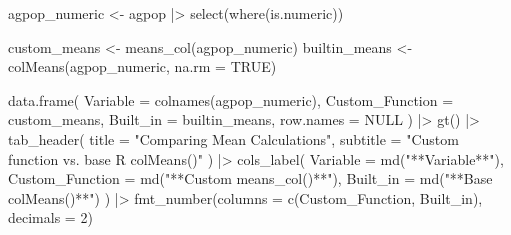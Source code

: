 \documentclass[
  letterpaper,
  DIV=11,
  numbers=noendperiod]{scrreprt}
\newenvironment{Shaded}{\begin{snugshade}}{\end{snugshade}}
\newcommand{\AttributeTok}[1]{\textcolor[rgb]{0.40,0.45,0.13}{#1}}
\newcommand{\ConstantTok}[1]{\textcolor[rgb]{0.56,0.35,0.01}{#1}}
\newcommand{\DecValTok}[1]{\textcolor[rgb]{0.68,0.00,0.00}{#1}}
\newcommand{\FunctionTok}[1]{\textcolor[rgb]{0.28,0.35,0.67}{#1}}
\newcommand{\NormalTok}[1]{\textcolor[rgb]{0.00,0.23,0.31}{#1}}
\newcommand{\OtherTok}[1]{\textcolor[rgb]{0.00,0.23,0.31}{#1}}
\newcommand{\SpecialCharTok}[1]{\textcolor[rgb]{0.37,0.37,0.37}{#1}}
\newcommand{\StringTok}[1]{\textcolor[rgb]{0.13,0.47,0.30}{#1}}
\renewcommand{\[}{\begin{equation}}
\renewcommand{\]}{\end{equation}}
\begin{document}
\begin{Shaded}
\begin{Highlighting}[]
\NormalTok{agpop\_numeric }\OtherTok{\textless{}{-}}\NormalTok{ agpop }\SpecialCharTok{|\textgreater{}} \FunctionTok{select}\NormalTok{(}\FunctionTok{where}\NormalTok{(is.numeric))}

\NormalTok{custom\_means  }\OtherTok{\textless{}{-}} \FunctionTok{means\_col}\NormalTok{(agpop\_numeric)}
\NormalTok{builtin\_means }\OtherTok{\textless{}{-}} \FunctionTok{colMeans}\NormalTok{(agpop\_numeric, }\AttributeTok{na.rm =} \ConstantTok{TRUE}\NormalTok{)}

\FunctionTok{data.frame}\NormalTok{(}
  \AttributeTok{Variable        =} \FunctionTok{colnames}\NormalTok{(agpop\_numeric),}
  \AttributeTok{Custom\_Function =}\NormalTok{ custom\_means,}
  \AttributeTok{Built\_in        =}\NormalTok{ builtin\_means,}
  \AttributeTok{row.names       =} \ConstantTok{NULL}
\NormalTok{) }\SpecialCharTok{|\textgreater{}}
  \FunctionTok{gt}\NormalTok{() }\SpecialCharTok{|\textgreater{}}
  \FunctionTok{tab\_header}\NormalTok{(}
    \AttributeTok{title =} \StringTok{"Comparing Mean Calculations"}\NormalTok{,}
    \AttributeTok{subtitle =} \StringTok{"Custom function vs. base R colMeans()"}
\NormalTok{  ) }\SpecialCharTok{|\textgreater{}}
  \FunctionTok{cols\_label}\NormalTok{(}
    \AttributeTok{Variable        =} \FunctionTok{md}\NormalTok{(}\StringTok{"**Variable**"}\NormalTok{),}
    \AttributeTok{Custom\_Function =} \FunctionTok{md}\NormalTok{(}\StringTok{"**Custom \textasciigrave{}means\_col()\textasciigrave{}**"}\NormalTok{),}
    \AttributeTok{Built\_in        =} \FunctionTok{md}\NormalTok{(}\StringTok{"**Base \textasciigrave{}colMeans()\textasciigrave{}**"}\NormalTok{)}
\NormalTok{  ) }\SpecialCharTok{|\textgreater{}}
  \FunctionTok{fmt\_number}\NormalTok{(}\AttributeTok{columns =} \FunctionTok{c}\NormalTok{(Custom\_Function, Built\_in), }\AttributeTok{decimals =} \DecValTok{2}\NormalTok{)}
\end{Highlighting}
\end{Shaded}
\end{document}
